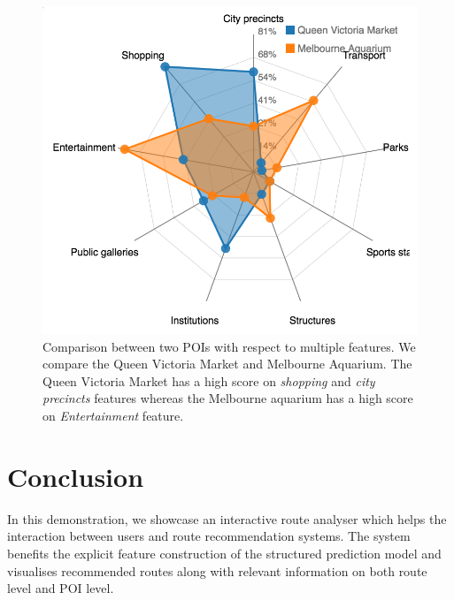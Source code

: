 \documentclass[sigconf]{acmart}
\begin{document}
\begin{figure}[t!]
\includegraphics[width=0.8\linewidth]{figure/sample_radar.png}
\caption{Comparison between two POIs with respect to multiple features. We compare the Queen Victoria Market and Melbourne Aquarium. The Queen Victoria Market has a high score on \textit{shopping} and \textit{city precincts} features whereas the Melbourne aquarium has a high score on \textit{Entertainment} feature.}
\label{fig:radar}
\end{figure}


\section{Conclusion}
In this demonstration, we showcase an interactive route analyser which helps the interaction between users and route recommendation systems. 
The system benefits the explicit feature construction of the structured prediction model and visualises recommended routes along with relevant information on both route level and POI level.


 
\end{document}
